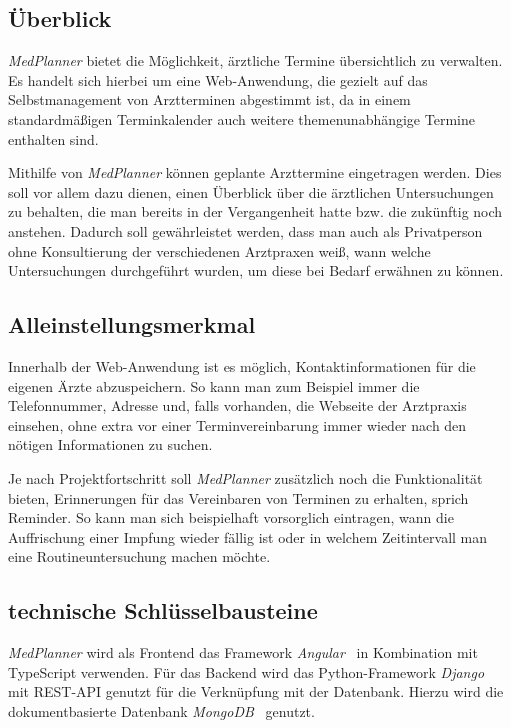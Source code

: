 \documentclass[conference]{IEEEtran}
\begin{document}
\subsection{Überblick}
\textit{MedPlanner} bietet die Möglichkeit, ärztliche Termine übersichtlich zu verwalten. Es handelt sich hierbei um eine Web-Anwendung, die gezielt auf das Selbstmanagement von Arztterminen abgestimmt ist, da in einem standardmäßigen Terminkalender auch weitere themenunabhängige Termine enthalten sind.

Mithilfe von \textit{MedPlanner} können geplante Arzttermine eingetragen werden. Dies soll vor allem dazu dienen, einen Überblick über die ärztlichen Untersuchungen zu behalten, die man bereits in der Vergangenheit hatte bzw. die zukünftig noch anstehen. Dadurch soll gewährleistet werden, dass man auch als Privatperson ohne Konsultierung der verschiedenen Arztpraxen weiß, wann welche Untersuchungen durchgeführt wurden, um diese bei Bedarf erwähnen zu können.

\subsection{Alleinstellungsmerkmal}
Innerhalb der Web-Anwendung ist es möglich, Kontaktinformationen für die eigenen Ärzte abzuspeichern. So kann man zum Beispiel immer die Telefonnummer, Adresse und, falls vorhanden, die Webseite der Arztpraxis einsehen, ohne extra vor einer Terminvereinbarung immer wieder nach den nötigen Informationen zu suchen.

Je nach Projektfortschritt soll \textit{MedPlanner} zusätzlich noch die Funktionalität bieten, Erinnerungen für das Vereinbaren von Terminen zu erhalten, sprich Reminder. So kann man sich beispielhaft vorsorglich eintragen, wann die Auffrischung einer Impfung wieder fällig ist oder in welchem Zeitintervall man eine Routineuntersuchung machen möchte.\\

\subsection{technische Schlüsselbausteine}
\textit{MedPlanner} wird als Frontend das Framework \textit{Angular}~\cite{angular} in Kombination mit TypeScript verwenden. Für das Backend wird das Python-Framework \textit{Django}~\cite{django} mit REST-API genutzt für die Verknüpfung mit der Datenbank. Hierzu wird die dokumentbasierte Datenbank \textit{MongoDB}~\cite{mongodb} genutzt.
\end{document}
